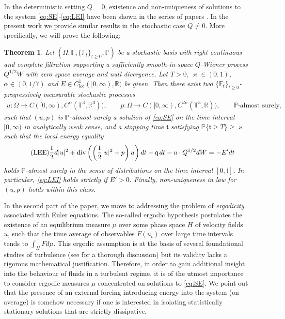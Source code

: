 \documentclass[10pt,a4paper]{amsart}
\numberwithin{equation}{section}
\newtheorem{thm}{Theorem}[section]
\numberwithin{corollario}{section}
\numberwithin{lemma}{section}
\numberwithin{prop}{section}
\theoremstyle{definition}
\theoremstyle{remark}
\newcommand{\R}{\mathbb{R}}
\newcommand{\T}{\mathbb{T}}
\newcommand{\dvg}{\mathord{{\rm div}}}
\begin{document}
In the deterministic setting $Q=0$, existence and non-uniqueness of solutions to the system \eqref{eq:SE}-\eqref{eq:LEI} have been shown in the series of papers \cite{DLSz10,Is22,DLK23,GiKwNo}.
In the present work we provide similar results in the stochastic case $Q \neq 0$.
More specifically, we will prove the following: 
\begin{thm}\label{thm:main1}
    Let $(\Omega, \mathbb{F},\{\mathbb{F}_t\}_{t \geq 0}, \mathbb{P})$ be a stochastic basis with right-continuous and complete filtration supporting a sufficiently smooth-in-space $Q$-Wiener process $Q^{1/2}W$ with zero space average and null divergence. 
    Let $T>0$, $\varkappa\in (0,1)$, $\alpha \in (0,1/7)$ and $E\in C^1_{loc}([0,\infty),\R)$ be given.
    Then there exist two $\{\mathbb{F}_t\}_{t \geq 0}$-progressively measurable stochastic processes 
    \begin{align}
        u : \Omega \to C([0,\infty), C^\alpha(\T^3,\R^3)),
        \qquad
        p: \Omega \to C([0,\infty), C^{2\alpha}(\T^3,\R)),
        \qquad
        \mathbb{P}\mbox{-almost surely,}
    \end{align}
    such that $(u,p)$ is $\mathbb{P}$-almost surely a solution of \eqref{eq:SE} on the time interval $[0,\infty)$ in analytically weak sense, and a stopping time $\mathfrak{t}$ satisfying $\mathbb{P}\{\mathfrak{t} \geq T\} \geq \varkappa$ such that the local energy equality
      \begin{align} \label{eq:LEE} \tag{LEE}
      \frac12 d |u|^2
+
\dvg\left( \left( \frac12 |u|^2 + p \right) u \right)dt
-
\mathfrak{q}\,dt
-
u \cdot Q^{1/2} dW
= -E'dt
  \end{align}
holds $\mathbb{P}$-almost surely in the sense of distributions on the time interval $[0,\mathfrak{t}]$. In particular, \eqref{eq:LEI} holds strictly if $E'>0$.
Finally, non-uniqueness in law for $(u,p)$ holds within this class.
\end{thm}

In the second part of the paper, we move to addressing the problem of \emph{ergodicity} associated with Euler equations.
The so-called ergodic hypothesis postulates the existence of an equilibrium measure $\mu$ over some phase space $H$ of velocity fields $u$, such that the time average of observables $F(u_t)$ over large time intervals tends to $\int_{H} F d\mu$. 
This ergodic assumption is at the basis of several foundational studies of turbulence (see \cite[Chapter IV]{FMRT01} for a thorough discussion) but its validity lacks a rigorous mathematical justification. 
Therefore, in order to gain additional insight into the behaviour of fluids in a turbulent regime, it is of the utmost importance to consider ergodic measures $\mu$ concentrated on solutions to \eqref{eq:SE}.
We point out that the presence of an external forcing introducing energy into the system (on average) is somehow necessary if one is interested in isolating statistically stationary solutions that are strictly dissipative.
\end{document}
